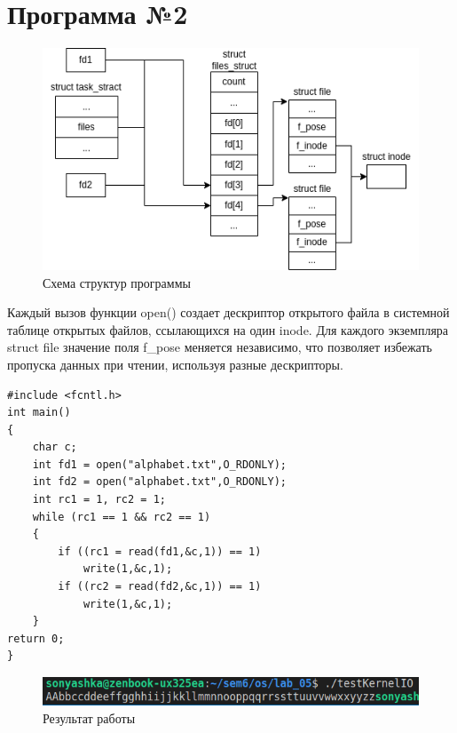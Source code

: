 \documentclass[14pt,a4paper]{scrreprt}
\begin{document}
\chapter{Программа №2}

\begin{figure}[H]
	\begin{center}
		\includegraphics[scale=0.77]{assets/dKernelIO.png}
	\end{center}
	\caption{Схема структур программы}
\end{figure}

Каждый вызов функции open() создает дескриптор открытого файла в системной таблице открытых файлов, ссылающихся на один inode. Для каждого экземпляра struct file значение поля f\_pose меняется независимо, что позволяет избежать пропуска данных при чтении, используя разные дескрипторы.

\begin{lstlisting}[caption=Исходная программа]
#include <fcntl.h>
int main()
{
	char c;
	int fd1 = open("alphabet.txt",O_RDONLY);
	int fd2 = open("alphabet.txt",O_RDONLY);
	int rc1 = 1, rc2 = 1;
	while (rc1 == 1 && rc2 == 1)
	{
		if ((rc1 = read(fd1,&c,1)) == 1)
			write(1,&c,1);
		if ((rc2 = read(fd2,&c,1)) == 1)
			write(1,&c,1);
	}
return 0;
}
\end{lstlisting}

\begin{figure}[H]
	\begin{center}
		\includegraphics[scale=0.7]{assets/testKernelIO.png}
	\end{center}
	\caption{Результат работы}
\end{figure}
\end{document}
